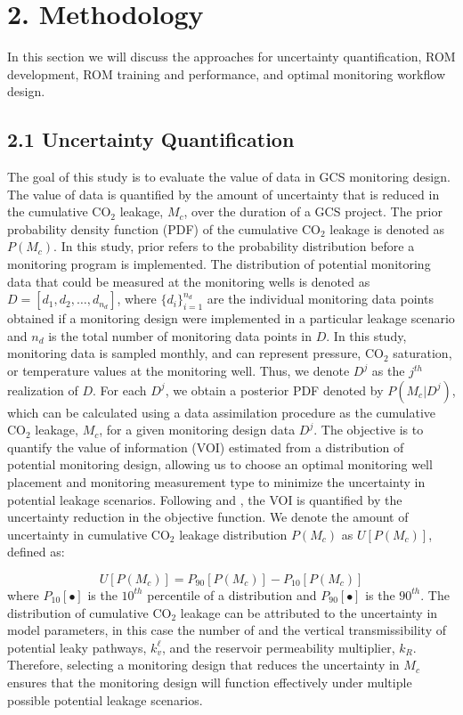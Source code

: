\documentclass[10pt, twoside]{article}
\begin{document}
\section*{\textbf{2. Methodology}}
In this section we will discuss the approaches for uncertainty quantification, ROM development, ROM training and performance, and optimal monitoring workflow design.


\subsection*{2.1 Uncertainty Quantification}
The goal of this study is to evaluate the value of data in GCS monitoring design. The value of data is quantified by the amount of uncertainty that is reduced in the cumulative CO$_2$ leakage, $M_c$, over the duration of a GCS project. The prior probability density function (PDF) of the cumulative CO$_2$ leakage is denoted as $P(M_c)$. In this study, prior refers to the probability distribution before a monitoring program is implemented. The distribution of potential monitoring data that could be measured at the monitoring wells is denoted as $D=[d_1,d_2,\ldots,d_{n_d}]$, where $\{d_i\}_{i=1}^{n_d}$ are the individual monitoring data points obtained if a monitoring design were implemented in a particular leakage scenario and $n_d$ is the total number of monitoring data points in $D$. In this study, monitoring data is sampled monthly, and can represent pressure, CO$_2$ saturation, or temperature values at the monitoring well. Thus, we denote $D^j$ as the $j^{th}$ realization of $D$. For each $D^j$, we obtain a posterior PDF denoted by $P(M_c \vert D^j)$, which can be calculated using a data assimilation procedure as the cumulative CO$_2$ leakage, $M_c$, for a given monitoring design data $D^j$. The objective is to quantify the value of information (VOI) estimated from a distribution of potential monitoring design, allowing us to choose an optimal monitoring well placement and monitoring measurement type to minimize the uncertainty in potential leakage scenarios.
Following \citet{Chen2017328, Chen2018} and \citet{Le2014505}, the VOI is quantified by the uncertainty reduction in the objective function. We denote the amount of uncertainty in cumulative CO$_2$ leakage distribution $P(M_c)$ as $U[P(M_c)]$, defined as:

\begin{equation} \label{eq:1}
    U[P(M_c)] = P_{90}[P(M_c)] - P_{10}[P(M_c)]
\end{equation}
where $P_{10}[\bullet]$ is the $10^{th}$ percentile of a distribution and $P_{90}[\bullet]$ is the $90^{th}$. The distribution of cumulative CO$_2$ leakage can be attributed to the uncertainty in model parameters, in this case the number of and the vertical transmissibility of potential leaky pathways, $k_v^\ell$, and the reservoir permeability multiplier, $k_R$. Therefore, selecting a monitoring design that reduces the uncertainty in $M_c$ ensures that the monitoring design will function effectively under multiple possible potential leakage scenarios.
\end{document}
